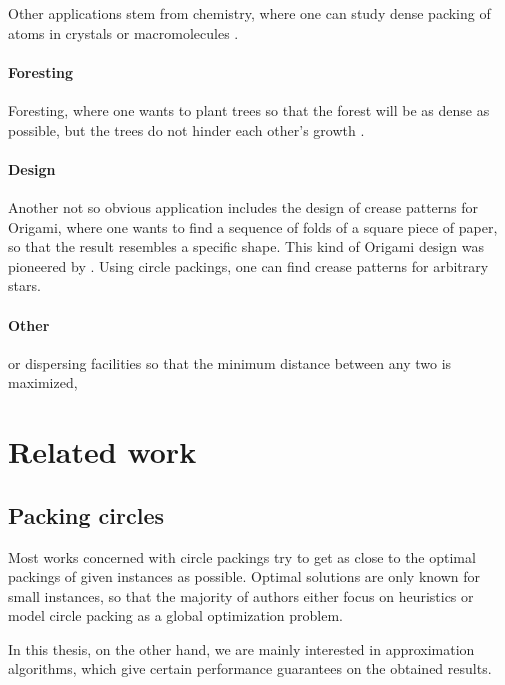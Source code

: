 Other applications stem from chemistry, where one can study dense packing of atoms in crystals or macromolecules \cite{WMP1994history}.

\paragraph{Foresting}

Foresting, where one wants to plant trees so that the forest will be as dense as possible, but the trees do not hinder each other's growth \cite{SMCSCG2007new}.

\paragraph{Design}

Another not so obvious application includes the design of crease patterns for Origami, where one wants to find a sequence of folds of a square piece of paper, so that the result resembles a specific shape. This kind of Origami design was pioneered by \cite{lang1996computational}. Using circle packings, one can find crease patterns for arbitrary stars.


\paragraph{Other}

or dispersing facilities so that the minimum distance between any two is maximized,

\section{Related work}

\subsection{Packing circles}

Most works concerned with circle packings try to get as close to the optimal packings of given instances as possible. Optimal solutions are only known for small instances, so that the majority of authors either focus on heuristics or model circle packing as a global optimization problem.

In this thesis, on the other hand, we are mainly interested in approximation algorithms, which give certain performance guarantees on the obtained results.


